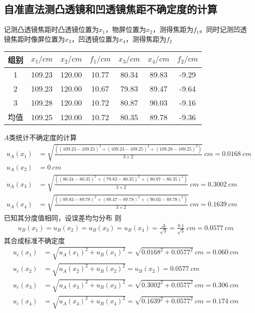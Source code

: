 \documentclass[UTF8]{ctexart}
\begin{document}
\subsection{自准直法测凸透镜和凹透镜焦距不确定度的计算}
记测凸透镜焦距时凸透镜位置为$x_1$，物屏位置为$x_2$，测得焦距为$f_1$。同时记测凹透镜焦距时像屏位置为$x_3$，凹透镜位置为$x_4$，测得焦距为$f_2$
\begin{table}[H]
\centering
    \begin{tabular}{|c|c|c|c|c|c|c|}
    \hline
      组别   &  $x_1/cm$  & $x_2/cm$  & $f_1/cm$  & $x_3/cm$ & $x_4/cm$  & $f_2/cm$\\
      \hline
       1  &  109.23 & 120.00  & 10.77  & 80.34 & 89.83 & -9.29 \\
       \hline
       2  &  109.23 & 120.00  & 10.67 & 79.83 & 89.47 & -9.64 \\
       \hline
       3  &  109.28  & 120.00  & 10.72 & 80.87 & 90.03 & -9.16 \\
       \hline
       均值 &  109.25  & 120.00  &  10.72 & 80.35 & 89.78 & -9.36 \\
       \hline
    \end{tabular}
    \label{tab:my_label}
\end{table}
\vspace{7cm}%
$A$类统计不确定度的计算
\begin{align*}
    u_A(x_1) &=\sqrt{\frac{\left( \left( 109.23-109.25  \right)^{2} +
    \left(109.23-109.25\right)^{2} +
    \left(109.28-109.25\right)^{2}\right)}
    {3 \times 2}} \ cm = 0.0168 \ cm \\
    u_A(x_2) &=  0 \ cm \\
    u_A(x_3) &=\sqrt{\frac{\left( \left( 80.34-80.35  \right)^{2} +
    \left(79.83 - 80.35\right)^{2} +
    \left(80.87 - 80.35\right)^{2}\right)}
    {3 \times 2}} \ cm = 0.3002 \ cm \\
    u_A(x_4) &=\sqrt{\frac{\left( \left( 89.83 - 89.78  \right)^{2} +
    \left( 89.47 - 89.78\right)^{2} +
    \left(90.03 - 89.78\right)^{2}\right)}
    {3 \times 2}} \ cm = 0.1639 \ cm
\end{align*}
已知其分度值相同，设误差均匀分布 则
\begin{align*}
     u_B(x_1)  = u_B(x_2) =  u_B(x_3) =  u_B(x_4) =\frac{\Delta}{\sqrt{3}} = \frac{0.1}{\sqrt{3}} \ cm= 0.0577 \ cm 
\end{align*}
其合成标准不确定度
\begin{align*}
    u_c(x_1) &= \sqrt{u_A(x_1)^2+u_B(x_1)^2} = \sqrt{0.0168^2 + 0.0577^2} \ cm  = 0.060 \ cm \\
    u_c(x_2) &= \sqrt{u_A(x_2)^2+u_B(x_2)^2} = u_B(x_2) = 0.0577 \ cm \\
    u_c(x_3) &= \sqrt{u_A(x_3)^2+u_B(x_3)^2} = \sqrt{0.3002^2 + 0.0577^2} \ cm  = 0.306 \ cm \\
    u_c(x_4) &= \sqrt{u_A(x_4)^2+u_B(x_4)^2} = \sqrt{0.1639^2 + 0.0577^2} \ cm  = 0.174 \ cm 
\end{align*}
\end{document}
